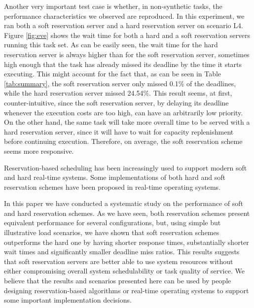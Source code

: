 \documentclass[times, 10pt,twocolumn]{article}
\begin{document}
Another very important test case is whether, in non-synthetic tasks,
the performance characteristics we observed are reproduced. In this
experiment, we ran both a soft reservation server and a hard
reservation server on scenario L4. Figure \ref{fig:eve} shows the wait
time for both a hard and a soft reservation servers running this task
set. As can be easily seen, the wait time for the hard reservation
server is always higher than for the soft reservation server,
sometimes high enough that the task has already missed its deadline by
the time it starts executing. This might account for the fact that, as
can be seen in Table \ref{tab:summary}, the soft reservation server
only missed 0.1\% of the deadlines, while the hard reservation server
missed 24.54\%. This result seems, at first, counter-intuitive, since
the soft reservation server, by delaying its deadline whenever the
execution costs are too high, can have an arbitrarily low priority. On
the other hand, the same task will take more overall time to be served
with a hard reservation server, since it will have to wait for
capacity replenishment before continuing execution. Therefore, on
average, the soft reservation scheme seems more responsive.

\label{sec:conclusion}

Reservation-based scheduling has been increasingly used to support
modern soft and hard real-time systems. Some implementations of both
hard and soft reservation schemes have been proposed in real-time
operating systems.

In this paper we have conducted a systematic study on the performance
of soft and hard reservation schemes. As we have seen, both
reservation schemes present equivalent performance for several
configurations, but, using simple but illustrative load scenarios, we
have shown that soft reservation schemes outperforms the hard one by
having shorter response times, substantially shorter wait times and
significantly smaller deadline miss ratios. This results suggests that
soft reservation servers are better able to use system resources
without either compromising overall system schedulability or task
quality of service. We believe that the results and scenarios
presented here can be used by people designing reservation-based
algorithms or real-time operating systems to support some important
implementation decisions.



\end{document}
